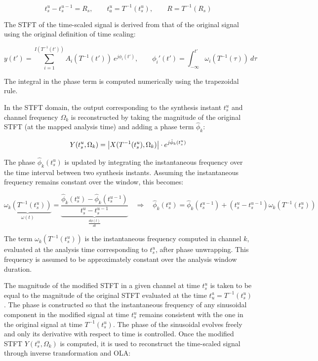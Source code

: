 \[
t_s^u - t_s^{u-1} = R_s, \qquad
t_a^u = T^{-1}(t_s^u), \qquad
R = T^{-1}(R_s)
\]

The STFT of the time-scaled signal is derived from that of the original signal using the original definition of time scaling:

\[
y(t') = \sum_{i=1}^{I \left(T^{-1}(t')\right)} A_i \left(T^{-1}(t')\right) \ e^{j \phi_i(t')}, \qquad \phi_i'(t') = \int_{-\infty}^{t'} \omega_i \left(T^{-1}(\tau) \right) \ d\tau
\]

The integral in the phase term is computed numerically using the trapezoidal rule.

In the STFT domain, the output corresponding to the synthesis instant $t_s^u$ and channel frequency $\Omega_k$ is reconstructed by taking the magnitude of the original STFT (at the mapped analysis time) and adding a phase term $\hat{\phi}_k$:

\[
Y(t_s^u, \Omega_k) = \abs{X(T^{-1}(t_s^u), \Omega_k)} \cdot e^{j \hat{\phi}_k(t_s^u)}
\]

The phase $\hat{\phi}_k(t_s^u)$ is updated by integrating the instantaneous frequency over the time interval between two synthesis instants. Assuming the instantaneous frequency remains constant over the window, this becomes:

\[
\underbrace{\omega_k(T^{-1}(t_s^u))}_{\omega(t)} = \underbrace{\frac{\hat{\phi}_k(t_s^u) - \hat{\phi}_k(t_s^{u-1})}{t_s^u - t_s^{u-1}}}_{\frac{d \phi(t)}{dt}} \quad \Rightarrow \quad
\hat{\phi}_k(t_s^u) = \hat{\phi}_k(t_s^{u-1}) + (t_s^u - t_s^{u-1}) \omega_k(T^{-1}(t_s^u))
\]

The term $\omega_k(T^{-1}(t_s^u))$ is the instantaneous frequency computed in channel $k$, evaluated at the analysis time corresponding to $t_s^u$, after phase unwrapping.
This frequency is assumed to be approximately constant over the analysis window duration.

The magnitude of the modified STFT in a given channel at time $t_s^u$ is taken to be equal to the magnitude of the original STFT evaluated at the time $t_u^a = T^{-1}(t_s^u)$.
The phase is constructed so that the instantaneous frequency of any sinusoidal component in the modified signal at time $t_s^u$ remains consistent with the one in the original signal at time $T^{-1}(t_s^u)$.
The phase of the sinusoidal evolves freely and only its derivative with respect to time is controlled.
Once the modified STFT $Y(t_s^u, \Omega_k)$ is computed, it is used to reconstruct the time-scaled signal through inverse transformation and OLA:

